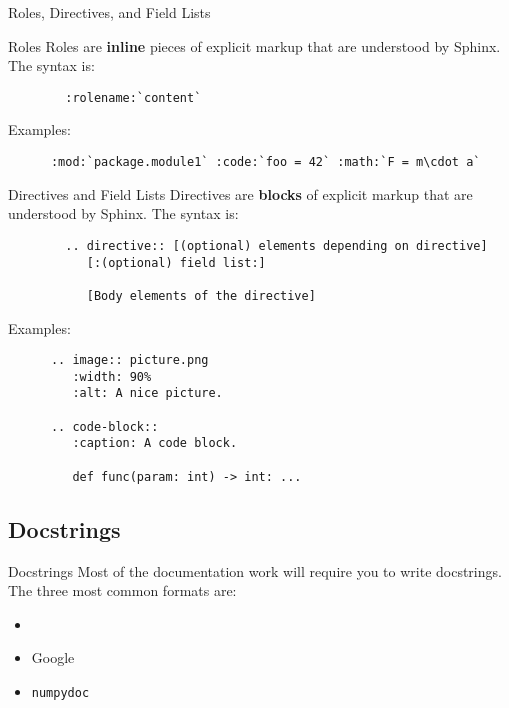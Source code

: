\begin{frame}[fragile]{
    Roles, Directives, and Field Lists
    \hfill
  }
  \begin{block}{Roles}
    Roles are \textbf{inline} pieces of explicit markup that are understood by Sphinx.
    The syntax is:
    \begin{center}
      \begin{verbatim}
        :rolename:`content`
      \end{verbatim}
    \end{center}

    Examples:
    \begin{verbatim}
      :mod:`package.module1` :code:`foo = 42` :math:`F = m\cdot a`
    \end{verbatim}
  \end{block}
  \begin{block}{Directives and Field Lists}
    Directives are \textbf{blocks} of explicit markup that are understood by Sphinx.
    The syntax is:
    \begin{center}
      \footnotesize
      \begin{verbatim}
        .. directive:: [(optional) elements depending on directive]
           [:(optional) field list:]

           [Body elements of the directive]
      \end{verbatim}
    \end{center}

    Examples:
    \footnotesize
    \begin{verbatim}
      .. image:: picture.png
         :width: 90%
         :alt: A nice picture.

      .. code-block::
         :caption: A code block.

         def func(param: int) -> int: ...
    \end{verbatim}
  \end{block}

\end{frame}

\subsection{Docstrings}
\begin{frame}[fragile]{Docstrings}
  Most of the documentation work will require you to write docstrings. The three most common
  formats are:
  \begin{itemize}
    \item \reST
    \item Google
    \item \texttt{numpydoc}
  \end{itemize}
\end{frame}

